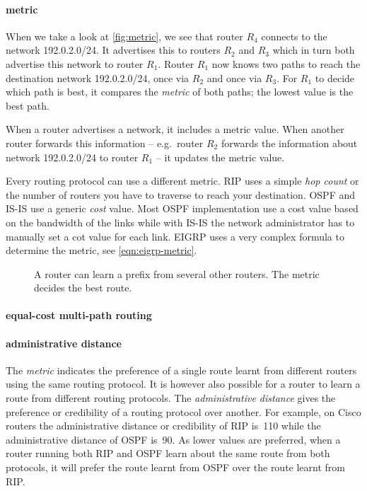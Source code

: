 \paragraph{metric}
When we take a look at \vref{fig:metric}, we see that router $R_4$ connects to the network 192.0.2.0/24.
It advertises this to routers $R_2$ and $R_3$ which in turn both advertise this network to router $R_1$.
Router $R_1$ now knows two paths to reach the destination network 192.0.2.0/24, once via $R_2$ and once via $R_3$.
For $R_1$ to decide which path is best, it compares the \emph{metric} of both paths; the lowest value is the best path.

When a router advertises a network, it includes a metric value.
When another router forwards this information -- e.g.~router $R_2$ forwards the information about network 192.0.2.0/24 to router $R_1$ -- it updates the metric value.

Every routing protocol can use a different metric.
\acs{RIP} uses a simple \emph{hop count} or the number of routers you have to traverse to reach your destination.
\acs{OSPF} and \acs{IS-IS} use a generic \emph{cost} value.
Most \acs{OSPF} implementation use a cost value based on the bandwidth of the links while with \acs{IS-IS} the network administrator has to manually set a cot value for each link.
\acs{EIGRP} uses a very complex formula to determine the metric, see \vref{eqn:eigrp-metric}.

\begin{figure}
   \centering
   
   \caption[The metric decides the best route in a network]{A router can learn a prefix from several other routers. The metric decides the best route.}
   \label{fig:metric}
\end{figure}

\paragraph{equal-cost multi-path routing}

\paragraph{administrative distance}
The \emph{metric} indicates the preference of a single route learnt from different routers using the same routing protocol.
It is however also possible for a router to learn a route from different routing protocols.
The \emph{administrative distance} gives the preference or credibility of a routing protocol over another.
For example, on Cisco routers the administrative distance or credibility of \acs{RIP} is~110 while the administrative distance of \acs{OSPF} is~90.
As lower values are preferred, when a router running both \acs{RIP} and \acs{OSPF} learn about the same route from both protocols, it will prefer the route learnt from \acs{OSPF} over the route learnt from \acs{RIP}.

